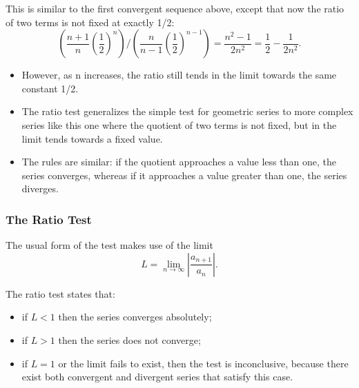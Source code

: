 \documentclass{beamer}
\begin{document}
\begin{frame}
	This is similar to the first convergent sequence above, except that now the ratio of two terms is not fixed at exactly 1/2:
	\[ \left(\frac{n+1}{n} \left(\frac{1}{2}\right)^n\right)/\left(\frac{n}{n-1} \left(\frac{1}{2}\right)^{n-1}\right) = \frac{n^2-1}{2n^2} = \frac{1}{2} - \frac{1}{2n^2}.\]
	
\end{frame}
\begin{frame}
\begin{itemize}	
\item 	However, as n increases, the ratio still tends in the limit towards the same constant 1/2. 
\item The ratio test generalizes the simple test for geometric series to more 
	complex series like this one where the quotient of two terms is not fixed, but in the limit tends towards a fixed value.\item The rules are similar: if the quotient approaches a value less than one, the series converges, whereas if it approaches a value greater than one, the series diverges.
	\end{itemize}
\end{frame}
\begin{frame}
\frametitle{The Ratio Test}
	The usual form of the test makes use of the limit
	\[L = \lim_{n\rightarrow\infty}\left|\frac{a_{n+1}}{a_n}\right|.\]
	
\end{frame}
\begin{frame}
	
	
	The ratio test states that:
	\begin{itemize}
		\item if $L < 1$ then the series converges absolutely;
		\item if $L > 1$ then the series does not converge;
		\item if $L = 1$ or the limit fails to exist, then the test is inconclusive, because there exist both convergent and divergent series that satisfy this case.
	\end{itemize}
\end{frame}
\end{document}
